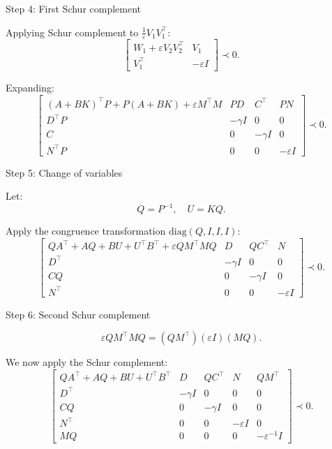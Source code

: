 \documentclass{beamer}
\begin{document}
\begin{frame}{Step 4: First Schur complement}
\begin{flushleft}
	
	Applying Schur complement to $\frac{1}{\varepsilon} V_1 V_1^\top$:
	\[
	\begin{bmatrix}
		W_1 + \varepsilon V_2 V_2^\top & V_1 \\
		V_1^\top & -\varepsilon I
	\end{bmatrix}
	\prec 0.
	\]
	
	Expanding:
	\[
	\begin{bmatrix}
		(A + BK)^\top P + P(A + BK) + \varepsilon M^\top M & PD & C^\top & PN \\
		D^\top P & -\gamma I & 0 & 0 \\
		C & 0 & -\gamma I & 0 \\
		N^\top P & 0 & 0 & -\varepsilon I
	\end{bmatrix}
	\prec 0.
	\]
	
\end{flushleft}
\end{frame}


\begin{frame}{Step 5: Change of variables}
\begin{flushleft}
	
	Let:
	\[
	Q = P^{-1}, \quad U = KQ.
	\]
	
	Apply the congruence transformation $\mathrm{diag}(Q, I, I, I)$:
	\[
	\begin{bmatrix}
		QA^\top + AQ + BU + U^\top B^\top + \varepsilon Q M^\top M Q
		& D & QC^\top & N \\
		D^\top & -\gamma I & 0 & 0 \\
		CQ & 0 & -\gamma I & 0 \\
		N^\top & 0 & 0 & -\varepsilon I
	\end{bmatrix}
	\prec 0.
	\]
	
	
\end{flushleft}
\end{frame}



\begin{frame}{Step 6: Second Schur complement}
	\begin{flushleft}
		
		\[
		\varepsilon Q M^\top M Q
		=
		(Q M^\top)(\varepsilon I)(M Q).
		\]
		
		We now apply the Schur complement:
		\[
		\begin{bmatrix}
			QA^\top + AQ + BU + U^\top B^\top
			& D
			& QC^\top
			& N
			& Q M^\top \\
			D^\top
			& -\gamma I
			& 0
			& 0
			& 0 \\
			CQ
			& 0
			& -\gamma I
			& 0
			& 0 \\
			N^\top
			& 0
			& 0
			& -\varepsilon I
			& 0 \\
			M Q
			& 0
			& 0
			& 0
			& -\varepsilon^{-1} I
		\end{bmatrix}
		\prec 0.
		\]
		
	\end{flushleft}
\end{frame}
\end{document}
